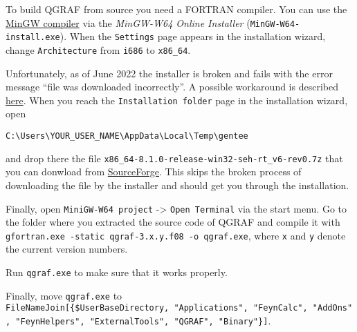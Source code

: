 \documentclass[../FeynHelpersManual.tex]{subfiles}
\begin{document}
To build QGRAF from source you need a FORTRAN compiler. You can use the
\href{https://sourceforge.net/projects/mingw-w64/files/mingw-w64}{MinGW
compiler} via the \emph{MinGW-W64 Online Installer}
(\texttt{MinGW-W64-install.exe}). When the \texttt{Settings} page
appears in the installation wizard, change \texttt{Architecture} from
\texttt{i686} to \texttt{x86_64}.

Unfortunately, as of June 2022 the installer is broken and fails with
the error message ``file was downloaded incorrectly''. A possible
workaround is described
\href{https://sourceforge.net/p/mingw-w64/support-requests/125/}{here}.
When you reach the \texttt{Installation folder} page in the installation
wizard, open

\begin{verbatim}
C:\Users\YOUR_USER_NAME\AppData\Local\Temp\gentee
\end{verbatim}

and drop there the file
\texttt{x86_64-8.1.0-release-win32-seh-rt_v6-rev0.7z} that you can
donwload from
\href{https://sourceforge.net/projects/mingw-w64/files/Toolchains\%20targetting\%20Win64/Personal\%20Builds/mingw-builds/8.1.0/threads-posix/seh/x86_64-8.1.0-release-posix-seh-rt_v6-rev0.7z}{SourceForge}.
This skips the broken process of downloading the file by the installer
and should get you through the installation.

Finally, open \texttt{MiniGW-W64 project} -\textgreater{}
\texttt{Open Terminal} via the start menu. Go to the folder where you
extracted the source code of QGRAF and compile it with
\texttt{gfortran.exe -static qgraf-3.x.y.f08 -o qgraf.exe}, where
\texttt{x} and \texttt{y} denote the current version numbers.

Run \texttt{qgraf.exe} to make sure that it works properly.

Finally, move \texttt{qgraf.exe} to
\texttt{FileNameJoin[\allowbreak{}\{\allowbreak{}\$UserBaseDirectory,\ \allowbreak{}"Applications",\ \allowbreak{}"FeynCalc",\ \allowbreak{}"AddOns",\ \allowbreak{}"FeynHelpers",\ \allowbreak{}"ExternalTools",\ \allowbreak{}"QGRAF",\ \allowbreak{}"Binary"\}]}.
\end{document}
